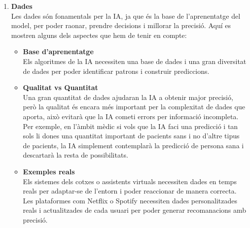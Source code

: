 \begin{enumerate}
    \item \textbf{Dades}\\
    Les dades són fonamentals per la IA, ja que és la base de l'aprenentatge del model, per poder raonar, prendre decisions i millorar la precisió. Aquí es mostren alguns dels aspectes que hem de tenir en compte:
    \begin{itemize}
        \item \textbf{Base d'aprenentatge}\\
        Els algoritmes de la IA necessiten una base de dades i una gran diversitat de dades per poder identificar patrons i construir prediccions.

        \item \textbf{Qualitat vs Quantitat}\\
        Una gran quantitat de dades ajudaran la IA a obtenir major precisió, però la qualitat és encara més important per la complexitat de dades que aporta, això evitarà que la IA cometi errors per informació incompleta. Per exemple, en l'àmbit mèdic si vols que la IA faci una predicció i tan sols li dones una quantitat important de pacients sans i no d'altre tipus de pacients, la IA simplement contemplarà la predicció de persona sana i descartarà la resta de possibilitats.

        \item \textbf{Exemples reals}\\
        Els sistemes dels cotxes o assistents virtuals necessiten dades en temps reals per adaptar-se de l'entorn i poder reaccionar de manera correcta. Les plataformes com Netflix o Spotify necessiten dades personalitzades reals i actualitzades de cada usuari per poder generar recomanacions amb precisió.
    \end{itemize}


\end{enumerate}
